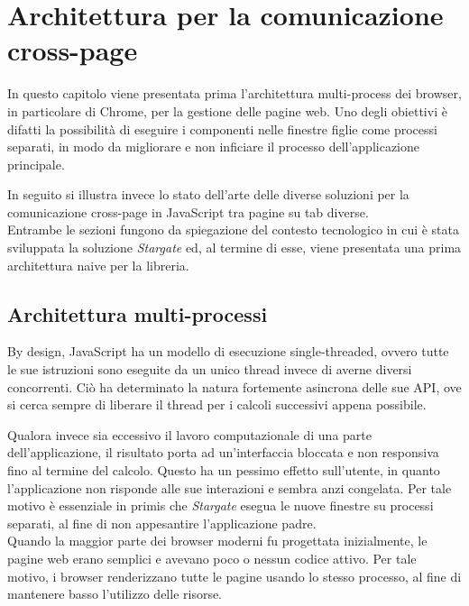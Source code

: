 
\chapter{Architettura per la comunicazione cross-page}
\label{cap:architettura-cross-page}

In questo capitolo viene presentata prima l'architettura multi-process dei browser, in particolare di Chrome, per la gestione delle pagine web. Uno degli obiettivi è difatti la possibilità di eseguire i componenti nelle finestre figlie come processi separati, in modo da migliorare e non inficiare il processo dell'applicazione principale.

In seguito si illustra invece lo stato dell'arte delle diverse soluzioni per la comunicazione cross-page in JavaScript tra pagine su tab diverse. \\

Entrambe le sezioni fungono da spiegazione del contesto tecnologico in cui è stata sviluppata la soluzione \textit{Stargate} ed, al termine di esse, viene presentata una prima architettura naive per la libreria.

\section{Architettura multi-processi}

By design, JavaScript ha un modello di esecuzione single-threaded, ovvero tutte le sue istruzioni sono eseguite da un unico thread invece di averne diversi concorrenti. Ciò ha determinato la natura fortemente asincrona delle sue API, ove si cerca sempre di liberare il thread per i calcoli successivi appena possibile.

Qualora invece sia eccessivo il lavoro computazionale di una parte dell'applicazione, il risultato porta ad un'interfaccia bloccata e non responsiva fino al termine del calcolo. Questo ha un pessimo effetto sull'utente, in quanto l'applicazione non risponde alle sue interazioni e sembra anzi congelata. Per tale motivo è essenziale in primis che \textit{Stargate} esegua le nuove finestre su processi separati, al fine di non appesantire l'applicazione padre. \\

Quando la maggior parte dei browser moderni fu progettata inizialmente, le pagine web erano semplici e avevano poco o nessun codice attivo. Per tale motivo, i browser renderizzano tutte le pagine usando lo stesso processo, al fine di mantenere basso l'utilizzo delle risorse. \\

